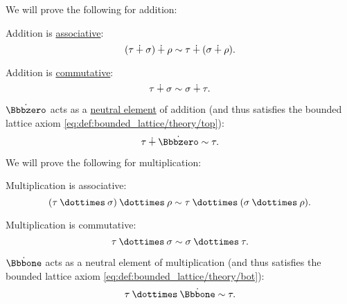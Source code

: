 \begin{proposition}
  We will prove the following for addition:
  \begin{thmenum}[resume=thm:simple_algebraic_type_arithmetic]
     Addition is \hyperref[def:binary_operation/associative]{associative}:
    \begin{equation}\label{eq:thm:simple_algebraic_type_arithmetic/addition_associative}
      (\tau \mathbin{\dotplus} \sigma) \mathbin{\dotplus} \rho \sim \tau \mathbin{\dotplus} (\sigma \mathbin{\dotplus} \rho).
    \end{equation}

     Addition is \hyperref[def:binary_operation/commutative]{commutative}:
    \begin{equation}\label{eq:thm:simple_algebraic_type_arithmetic/addition_commutative}
      \tau \mathbin{\dotplus} \sigma \sim \sigma \mathbin{\dotplus} \tau.
    \end{equation}

     \( \syn\Bbbzero \) acts as a \hyperref[def:monoid]{neutral element} of addition (and thus satisfies the bounded lattice axiom \eqref{eq:def:bounded_lattice/theory/top}):
    \begin{equation}\label{eq:thm:simple_algebraic_type_arithmetic/addition_neutral}
      \tau \synplus \syn\Bbbzero \sim \tau.
    \end{equation}
  \end{thmenum}

  We will prove the following for multiplication:
  \begin{thmenum}[resume=thm:simple_algebraic_type_arithmetic]
     Multiplication is associative:
    \begin{equation}\label{eq:thm:simple_algebraic_type_arithmetic/multiplication_associative}
      (\tau \syntimes \sigma) \syntimes \rho \sim \tau \syntimes (\sigma \syntimes \rho).
    \end{equation}

     Multiplication is commutative:
    \begin{equation}\label{eq:thm:simple_algebraic_type_arithmetic/multiplication_commutative}
      \tau \syntimes \sigma \sim \sigma \syntimes \tau.
    \end{equation}

     \( \syn\Bbbone \) acts as a neutral element of multiplication (and thus satisfies the bounded lattice axiom \eqref{eq:def:bounded_lattice/theory/bot}):
    \begin{equation}\label{eq:thm:simple_algebraic_type_arithmetic/multiplication_neutral}
      \tau \syntimes \syn\Bbbone \sim \tau.
    \end{equation}
  \end{thmenum}


\end{proposition}
